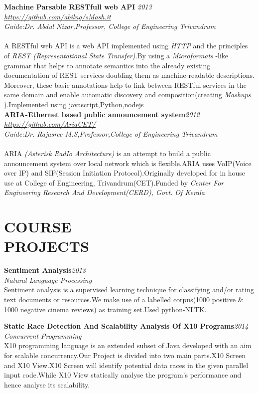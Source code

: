 \documentclass[line,margin]{res}
\begin{document}
\begin{resume}
  \textbf{ Machine Parsable RESTfull web API }\hfill \textit{2013}\\
  \textit{\url{https://github.com/abilng/sMash.it}}\\
  \textit{Guide:Dr. Abdul Nizar,Professor, College of Engineering Trivandrum}\\\\
  A RESTful web API is a web API implemented using \textit{HTTP }and the principles of \textit{REST (Representational State Transfer)}.By using  a \textit{Microformats }-like grammar that helps to annotate semantics into the already existing documentation of REST services doubling them as machine-readable descriptions. Moreover, these basic annotations help to link between RESTful services in the same domain and enable automatic discovery and composition(creating \textit{Mashups }).Implemented using javascript,Python,nodejs\\

  \textbf{ ARIA-Ethernet based public announcement system}\hfill \textit{2012}\\
  \textit{\url{https://github.com/AriaCET/}}\\
  \textit{Guide:Dr. Rajasree M.S,Professor,College of Engineering Trivandrum}\\\\
  ARIA \textit{(Asterisk RadIo Architecture)} is an attempt to build a public announcement system over local network which is flexible.ARIA uses VoIP(Voice over IP) and SIP(Session Initiation Protocol).Originally developed for in house use at College of Engineering, Trivandrum(CET).Funded by \textit{Center For Engineering Research And Development(CERD), Govt. Of Kerala}\\


  \section{COURSE \\ PROJECTS}

  \textbf{Sentiment Analysis}\hfill \textit{2013}\\
  \textit{Natural Language Processing}\\
  Sentiment analysis is a supervised learning technique for classifying and/or rating text documents or resources.We make use of a labelled corpus(1000 positive \& 1000 negative cinema reviews) as training set.Used python-NLTK.\newline


  \textbf{Static Race Detection And Scalability Analysis Of X10 Programs}\hfill\textit{2014}\\
  \textit{Concurrent Programming}\\
  X10 programming language is an extended subset of Java developed with an aim for
  scalable concurrency.Our Project is divided into two main parts.X10 Screen and X10 View.X10 Screen will identify potential data races in the given parallel input code.While X10 View statically analyse the program's performance and hence analyse its scalability.\newline



\end{resume}
\end{document}

